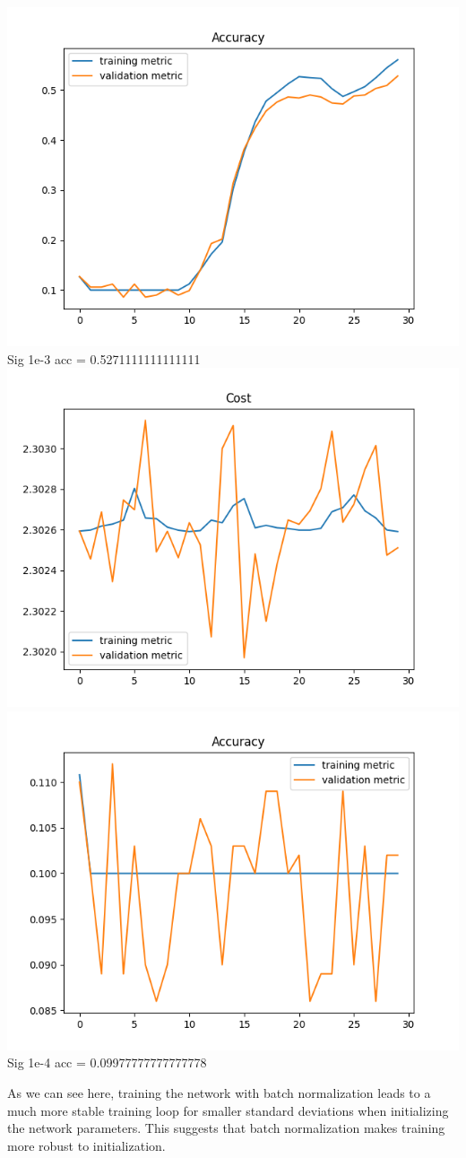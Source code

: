 \documentclass[11pt,a4paper]{article}
\begin{document}
\includegraphics[width=\textwidth]{no_batch_norm_sig=1e-3_accuracy-.png}
Sig 1e-3 acc = 0.5271111111111111\\
\includegraphics[width=\textwidth]{no_batch_norm_sig=1e-4_cost-.png}
\includegraphics[width=\textwidth]{no_batch_norm_sig=1e-4_accuracy-.png}
Sig 1e-4 acc = 0.09977777777777778


As we can see here, training the network with batch normalization leads to a much more stable training loop for smaller standard deviations when initializing the network parameters. This suggests that batch normalization makes training more robust to initialization.
\end{document}
